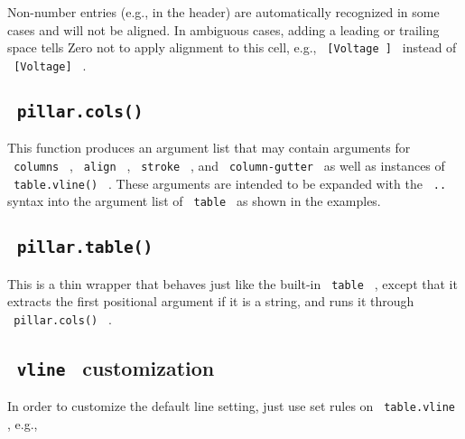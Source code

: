 
Non-number entries (e.g., in the header) are automatically recognized in
some cases and will not be aligned. In ambiguous cases, adding a leading
or trailing space tells Zero not to apply alignment to this cell, e.g.,
\texttt{\ {[}Voltage\ {]}\ } instead of \texttt{\ {[}Voltage{]}\ } .

\subsection{\texorpdfstring{\texttt{\ pillar.cols()\ }}{ pillar.cols() }}\label{pillar.cols}

This function produces an argument list that may contain arguments for
\texttt{\ columns\ } , \texttt{\ align\ } , \texttt{\ stroke\ } , and
\texttt{\ column-gutter\ } as well as instances of
\texttt{\ table.vline()\ } . These arguments are intended to be expanded
with the \texttt{\ ..\ } syntax into the argument list of
\texttt{\ table\ } as shown in the examples.

\subsection{\texorpdfstring{\texttt{\ pillar.table()\ }}{ pillar.table() }}\label{pillar.table}

This is a thin wrapper that behaves just like the built-in
\texttt{\ table\ } , except that it extracts the first positional
argument if it is a string, and runs it through
\texttt{\ pillar.cols()\ } .

\subsection{\texorpdfstring{\texttt{\ vline\ }
customization}{ vline  customization}}\label{vline-customization}

In order to customize the default line setting, just use set rules on
\texttt{\ table.vline\ } , e.g.,

\begin{Shaded}
\begin{Highlighting}[]

\end{Highlighting}
\end{Shaded}

